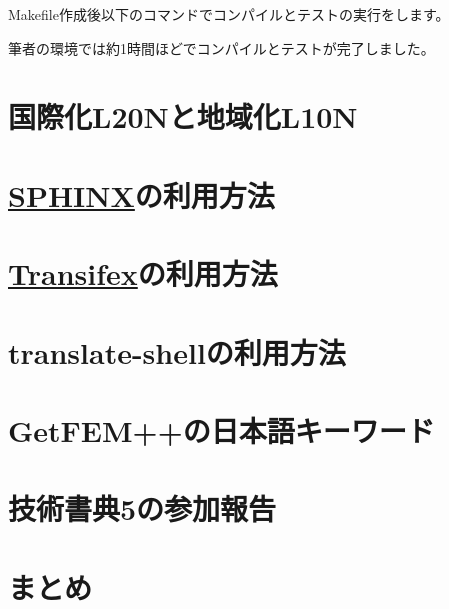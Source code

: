 \documentclass{../../style/ltjoc}
\begin{document}
Makefile作成後以下のコマンドでコンパイルとテストの実行をします。
\begin{shbox}
\end{shbox}
筆者の環境では約1時間ほどでコンパイルとテストが完了しました。

\section{国際化L20Nと地域化L10N}
\section{\href{http://www.sphinx-doc.org/en/master}{SPHINX}の利用方法}
\section{\href{https://www.transifex.com}{Transifex}の利用方法}
\section{translate-shellの利用方法}
\section{GetFEM++の日本語キーワード}
\section{技術書典5の参加報告}
\section{まとめ}
\end{document}
